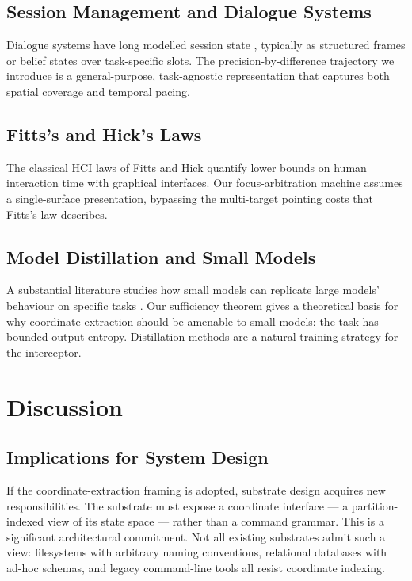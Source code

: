 \documentclass[11pt,a4paper]{article}
\theoremstyle{definition}
\theoremstyle{remark}
\begin{document}
\subsection{Session Management and Dialogue Systems}

Dialogue systems have long modelled session state \citep{young2013pomdp, henderson2014dst}, typically as structured frames or belief states over task-specific slots. The precision-by-difference trajectory we introduce is a general-purpose, task-agnostic representation that captures both spatial coverage and temporal pacing.

\subsection{Fitts's and Hick's Laws}

The classical HCI laws of Fitts \citep{fitts1954information} and Hick \citep{hick1952rate} quantify lower bounds on human interaction time with graphical interfaces. Our focus-arbitration machine assumes a single-surface presentation, bypassing the multi-target pointing costs that Fitts's law describes.

\subsection{Model Distillation and Small Models}

A substantial literature studies how small models can replicate large models' behaviour on specific tasks \citep{hinton2015distilling, sanh2019distilbert, jiao2020tinybert}. Our sufficiency theorem gives a theoretical basis for why coordinate extraction should be amenable to small models: the task has bounded output entropy. Distillation methods are a natural training strategy for the interceptor.

\section{Discussion}
\label{sec:discussion}

\subsection{Implications for System Design}

If the coordinate-extraction framing is adopted, substrate design acquires new responsibilities. The substrate must expose a coordinate interface --- a partition-indexed view of its state space --- rather than a command grammar. This is a significant architectural commitment. Not all existing substrates admit such a view: filesystems with arbitrary naming conventions, relational databases with ad-hoc schemas, and legacy command-line tools all resist coordinate indexing.
\end{document}
